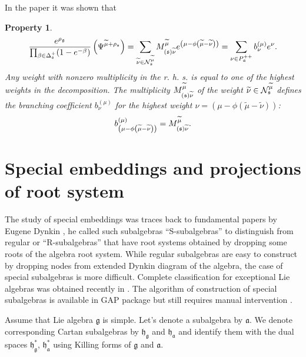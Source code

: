 \documentclass{article}
\newtheorem{Prop}[Def]{Property}
\newcommand{\gf}{\mathfrak{g}}
\newcommand{\af}{\mathfrak{a}}
\newcommand{\hf}{\mathfrak{h}}
\newcommand{\hfg}{\hf_{\gf}}
\newcommand{\hfa}{\hf_{\af}}
\begin{document}
In the paper \cite{2011arXiv1102.1702L} it was shown that

\begin{Prop}
\begin{equation}
\frac{e^{\rho _{\frak{g}}}}{\prod_{\beta \in \Delta _{\frak{s}%
}^{+}}(1-e^{-\beta })}\left( \Psi ^{\widetilde{\mu }+\rho _{\frak{s}%
}}\right) =\sum_{\widetilde{\nu }\in \mathcal{N}_{\frak{s}}^{\widetilde{\mu }%
}}M_{\left( \frak{s}\right) \widetilde{\nu }}^{\widetilde{\mu }}e^{\left(
\mu -\phi \left( \widetilde{\mu }-\widetilde{\nu }\right) \right)
}=\sum_{\nu \in P_{\frak{a}}^{++}}b_{\nu }^{(\mu )}e^{\nu }.
\label{singular main-4}
\end{equation}
Any weight with nonzero multiplicity in the r. h. s. is equal to one of the
highest weights in the decomposition. The multiplicity $M_{\left( \frak{s}%
\right) \widetilde{\nu }}^{\widetilde{\mu }}$ of the weight  $\widetilde{\nu
}\in \mathcal{N}_{\frak{s}}^{\widetilde{\mu }}$ defines the branching
coefficient $b_{\nu }^{(\mu )}$ for the highest weight $\nu =\left( \mu
-\phi \left( \widetilde{\mu }-\widetilde{\nu }\right) \right) $:
\[
b_{\left( \mu -\phi \left( \widetilde{\mu }-\widetilde{\nu }\right) \right)
}^{(\mu )}=M_{\left( \frak{s}\right) \widetilde{\nu }}^{\widetilde{\mu }}.
\]
\end{Prop}



\section{Special embeddings and projections of root system}
\label{sec:spec-embedd-proj}

The study of special embeddings was traces back to fundamental papers by Eugene Dynkin
\cite{dynkin1952semisimple,dynkin1952maximal}, he called such subalgebras ``S-subalgebras'' to
distinguish from regular or ``R-subalgebras'' that have root systems obtained by dropping some roots
of the algebra root system. While regular subalgebras are easy to construct by dropping nodes from
extended Dynkin diagram of the algebra, the case of special subalgebras is more difficult. Complete
classification for exceptional Lie algebras was obtained recently in \cite{minchenko2006semisimple}.
The algorithm of construction of special subalgebras is available in GAP package but still requires
manual intervention \cite{de2011constructing}.  

Assume that Lie algebra $\gf$ is simple. Let's denote a subalgebra by
$\af$. We denote corresponding Cartan subalgebras by $\hfg$ and $\hfa$ and identify them with the dual
spaces $\hfg^{*}$, $\hfa^{*}$ using Killing forms of $\gf$ and $\af$.
\end{document}
